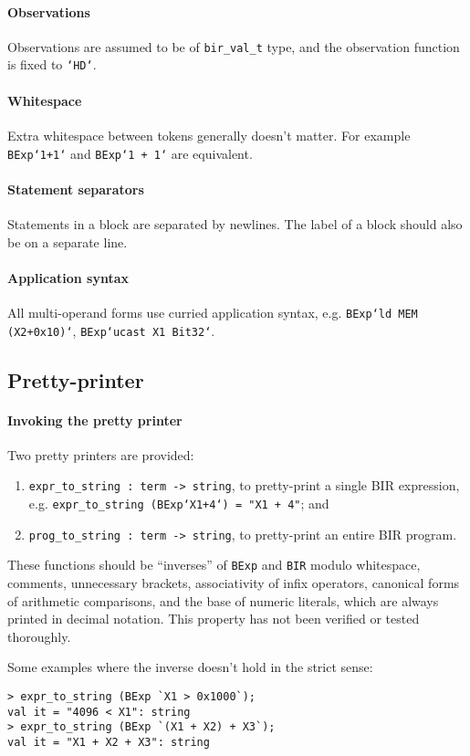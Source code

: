 \documentclass{article}
\begin{document}
\paragraph{Observations} Observations are assumed to be of \texttt{bir_val_t}
type, and the observation function is fixed to \texttt{`HD`}.

\paragraph{Whitespace} Extra whitespace between tokens generally doesn't matter.
For example \texttt{BExp`1+1`} and \texttt{BExp`1 + 1`} are equivalent.

\paragraph{Statement separators} Statements in a block are separated by
newlines. The label of a block should also be on a separate line.

\paragraph{Application syntax} All multi-operand forms use curried application
syntax, e.g. \texttt{BExp`ld MEM (X2+0x10)`}, \texttt{BExp`ucast X1 Bit32`}.

\newpage

\subsection{Pretty-printer}

\paragraph{Invoking the pretty printer} Two pretty printers are provided:
\begin{enumerate}
\item \texttt{expr_to_string : term -> string}, to pretty-print a single BIR expression, e.g.
  \texttt{expr_to_string (BExp`X1+4`) = "X1 + 4"}; and
\item \texttt{prog_to_string : term -> string}, to pretty-print an entire BIR program.
\end{enumerate}

These functions should be ``inverses'' of \texttt{BExp} and \texttt{BIR} modulo
whitespace, comments, unnecessary brackets, associativity of infix operators,
canonical forms of arithmetic comparisons, and the base of numeric literals,
which are always printed in decimal notation. This property has not been
verified or tested thoroughly.

Some examples where the inverse doesn't hold in the strict sense:

\begin{verbatim}
> expr_to_string (BExp `X1 > 0x1000`);
val it = "4096 < X1": string
> expr_to_string (BExp `(X1 + X2) + X3`);
val it = "X1 + X2 + X3": string
\end{verbatim}
\end{document}
